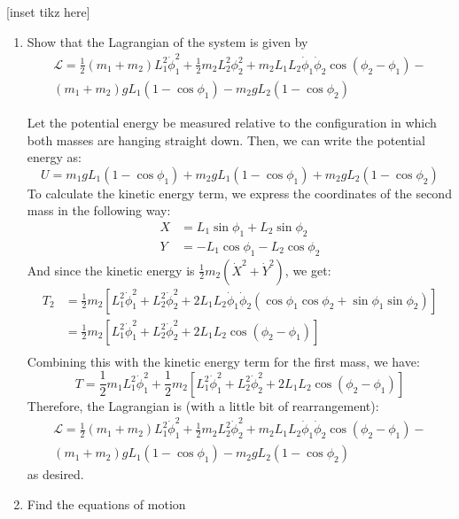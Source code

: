 \documentclass[10pt]{article}
\begin{document}
	[inset tikz here]
	\begin{enumerate}[label=\alph*)]
		\item Show that the Lagrangian of the system is given by 
		\begin{multline*}
		\mathcal L = \frac{1}{2}(m_1 + m_2)L_1^2 \dot \phi_1^2 + \frac{1}{2}m_2 L_2^2 \phi_2^2 +
		m_2L_1L_2 \dot \phi_1 \dot \phi_2 \cos(\phi_2 - \phi_1) -\\ (m_1 + m_2)gL_1(1-\cos \phi_1) -
		m_2gL_2(1 - \cos \phi_2)
		\end{multline*}

		\begin{solution}
			Let the potential energy be measured relative to the configuration in which both masses are hanging
			straight down. Then, we can write the potential energy as:
			\[
			U = m_1gL_1(1 - \cos \phi_1) + m_2gL_1(1 - \cos \phi_1) + m_2gL_2(1 - \cos \phi_2) 
			\] 
			To calculate the kinetic energy term, we express the coordinates of the second mass in the following
			way: 
			\begin{align*}
				X &= L_1 \sin \phi_1 + L_2 \sin \phi_2\\
				Y &= -L_1 \cos \phi_1 - L_2 \cos \phi_2
			\end{align*}
			And since the kinetic energy is $\frac{1}{2}m_2(\dot X^2 + \dot Y^2)$, we get: 
			\begin{align*}
				T_2 &= \frac{1}{2}m_2\left[L_1^2 \dot \phi_1^2 + L_2^2 \dot \phi_2^2 + 2L_1L_2\dot \phi_1
				\dot \phi_2 (\cos \phi_1 \cos \phi_2 + \sin \phi_1 \sin \phi_2)\right]\\
					&= \frac{1}{2}m_2\left[L_1^2 \dot \phi_1^2  + L_2^2 \dot \phi_2^2 + 2L_1L_2\cos(\phi_2 -
					\phi_1)\right]  \\
			\end{align*}
			Combining this with the kinetic energy term for the first mass, we have: 
			\[
			T = \frac{1}{2}m_1L_1^2 \dot \phi_1^2 + \frac{1}{2}m_2\left[ L_1^2 \dot \phi_1^2 + 
			L_2^2 \dot \phi_2^2 + 2L_1L_2 \cos(\phi_2 - \phi_1)\right]
			\] 
			Therefore, the Lagrangian is (with a little bit of rearrangement): 
			\begin{multline*}
			\mathcal L = \frac{1}{2}(m_1 + m_2)L_1^2 \dot \phi_1^2 + \frac{1}{2}m_2 L_2^2 \dot \phi_2^2 + 
			m_2L_1L_2 \dot \phi_1 \dot \phi_2 \cos(\phi_2 - \phi_1) -\\ (m_1 + m_2)gL_1(1-\cos \phi_1) -
			m_2gL_2(1 - \cos \phi_2)
			\end{multline*} 
			as desired. 
		\end{solution}
	\item Find the equations of motion


\end{enumerate}
\end{document}
